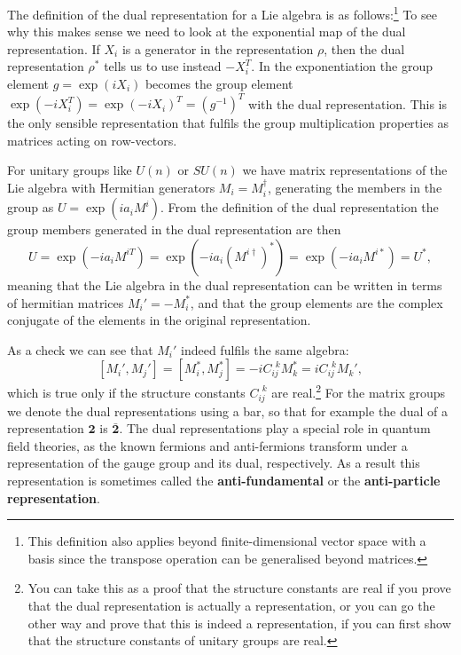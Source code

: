\documentclass[notes.tex]{subfiles}
\begin{document}
The definition of the dual representation for a Lie algebra is as follows:\footnote{This definition also applies beyond finite-dimensional vector space with a basis since the transpose operation can be generalised beyond matrices.}
To see why this makes sense we need to look at the exponential map of the dual representation. If $X_i$ is a generator in the representation $\rho$, then the dual representation $\rho^*$ tells us to use instead $-X_i^T$. In the exponentiation the group element $g=\exp(iX_i)$ becomes the group element $\exp(-iX_i^T)=\exp(-iX_i)^T=(g^{-1})^T$ with the dual representation. This is the only sensible representation that fulfils the group multiplication properties as matrices acting on row-vectors.

For unitary groups like $U(n)$ or $SU(n)$ we have matrix representations of the Lie algebra with Hermitian generators $M_i=M_i^\dagger$,  generating the members in the group as $U=\exp(ia_iM^i)$. From the definition of the dual representation the group members generated in the dual representation are then
\[ U=\exp(-ia_iM^{iT})=\exp(-ia_i(M^{i\dagger})^*)=\exp(-ia_iM^{i*})= U^*, \]
meaning that the Lie algebra in the dual representation can be written in terms of hermitian matrices $M_i'=-M_i^*$, and that the group elements are the complex conjugate of the elements in the original representation. 

As a check we can see that $M_i'$ indeed fulfils the same algebra:
\[ [M_i',M_j']=[M_i^*,M_j^*]=-iC_{ij}^{~~k}M_k^*=iC_{ij}^{~~k}M_k',\] 
which is true only if the structure constants $C_{ij}^{~~k}$ are real.\footnote{You can take this as a proof that the structure constants are real if you prove that the dual representation is actually a representation, or you can go the other way and prove that this is indeed a representation, if you can first show that the structure constants of unitary groups are real.}
For the matrix groups we denote the dual representations using a bar, so that for example the dual of a representation $\mathbf 2$ is $\mathbf {\bar 2}$. The dual representations play a special role in quantum field theories, as the known fermions and anti-fermions transform under a representation of the gauge group and its dual, respectively. As a result this representation is sometimes called the {\bf anti-fundamental} or the {\bf anti-particle representation}.
\end{document}
